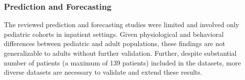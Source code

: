 \subsubsection{Prediction and Forecasting}
The reviewed prediction and forecasting studies were limited and involved only pediatric cohorts in inpatient settings. Given physiological and behavioral differences between pediatric and adult populations, these findings are not generalizable to adults without further validation. Further, despite substantial number of patients (a maximum of 139 patients) included in the datasets, more diverse datasets are necessary to validate and extend these results.